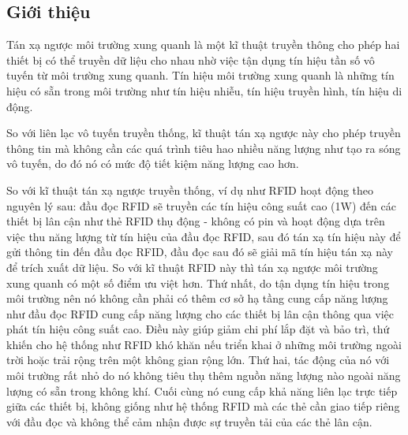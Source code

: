 \documentclass{uetgraduation}
\begin{document}
\subsection{Giới thiệu}
Tán xạ ngược môi trường xung quanh là một kĩ thuật truyền thông cho phép hai thiết bị có thể truyền dữ liệu cho nhau nhờ việc tận dụng tín hiệu tần số vô tuyến từ môi trường 
xung quanh. Tín hiệu môi trường xung quanh là những tín hiệu có sẵn trong môi trường như tín hiệu nhiễu, tín hiệu truyền hình, tín hiệu di động.

So với liên lạc vô tuyến truyền thống, kĩ thuật tán xạ ngược này cho phép truyền thông tin mà không cần các quá trình tiêu hao nhiều năng lượng như tạo ra sóng vô tuyến, 
do đó nó có mức độ tiết kiệm năng lượng cao hơn. 

So với kĩ thuật tán xạ ngược truyền thống, ví dụ như RFID hoạt động theo nguyên lý sau: đầu đọc RFID sẽ truyền các tín hiệu công suất cao (1W) đến 
các thiết bị lân cận như thẻ RFID thụ động - không có pin và hoạt động dựa trên việc thu năng lượng từ tín hiệu của đầu đọc RFID, sau đó tán xạ tín hiệu này để gửi thông tin
đến đầu đọc RFID, đầu đọc sau đó sẽ giải mã tín hiệu tán xạ này để trích xuất dữ liệu. So với kĩ thuật RFID này thì tán xạ ngược môi trường xung quanh có một số điểm ưu việt hơn.
Thứ nhất, do tận dụng tín hiệu trong môi trường nên nó không cần phải có thêm cơ sở hạ tầng cung cấp năng lượng như đầu đọc RFID cung cấp năng lượng cho các thiết bị lân cận 
thông qua việc phát tín hiệu công suất cao. Điều này giúp giảm chi phí lắp đặt và bảo trì, thứ khiến cho hệ thống như RFID khó khăn nếu triển khai ở những môi trường ngoài trời
hoặc trải rộng trên một không gian rộng lớn. Thứ hai, tác động của nó với môi trường rất nhỏ do nó không tiêu thụ thêm nguồn năng lượng nào ngoài năng lượng có sẵn trong không
khí. Cuối cùng nó cung cấp khả năng liên lạc trực tiếp giữa các thiết bị, không giống như hệ thống RFID mà các thẻ cần giao tiếp riêng với đầu đọc và không thể cảm nhận được sự
truyền tải của các thẻ lân cận.
\end{document}
